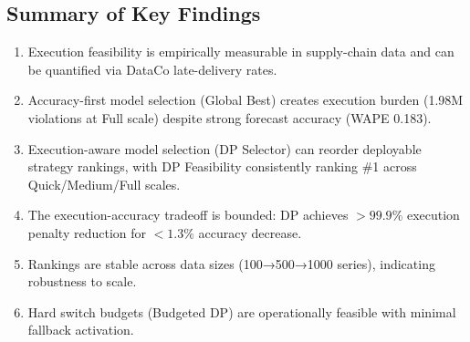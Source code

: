 \subsection{Summary of Key Findings}

\begin{enumerate}
    \item Execution feasibility is empirically measurable in supply-chain data and can be quantified via DataCo late-delivery rates.

    \item Accuracy-first model selection (Global Best) creates execution burden (1.98M violations at Full scale) despite strong forecast accuracy (WAPE 0.183).

    \item Execution-aware model selection (DP Selector) can reorder deployable strategy rankings, with DP Feasibility consistently ranking \#1 across Quick/Medium/Full scales.

    \item The execution-accuracy tradeoff is bounded: DP achieves $>99.9\%$ execution penalty reduction for $<1.3\%$ accuracy decrease.

    \item Rankings are stable across data sizes (100→500→1000 series), indicating robustness to scale.

    \item Hard switch budgets (Budgeted DP) are operationally feasible with minimal fallback activation.
\end{enumerate}
